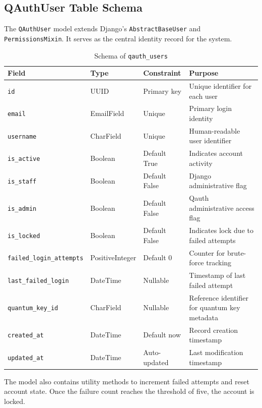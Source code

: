 \documentclass[12pt,a4paper]{report}
\begin{document}
\subsection{QAuthUser Table Schema}
The \texttt{QAuthUser} model extends Django's \texttt{AbstractBaseUser} and \texttt{PermissionsMixin}. It serves as the central identity record for the system.

\begin{table}[H]
\centering
\small
\renewcommand{\arraystretch}{1.3}
\caption{Schema of \texttt{qauth\_users}}
\label{tab:qauth-users}
\begin{tabular}{|p{4.0cm}|p{2.8cm}|p{1.8cm}|p{5.5cm}|}
\hline
\textbf{Field} & \textbf{Type} & \textbf{Constraint} & \textbf{Purpose} \\
\hline
\texttt{id} & UUID & Primary key & Unique identifier for each user \\
\hline
\texttt{email} & EmailField & Unique & Primary login identity \\
\hline
\texttt{username} & CharField & Unique & Human-readable user identifier \\
\hline
\texttt{is\_active} & Boolean & Default True & Indicates account activity \\
\hline
\texttt{is\_staff} & Boolean & Default False & Django administrative flag \\
\hline
\texttt{is\_admin} & Boolean & Default False & Qauth administrative access flag \\
\hline
\texttt{is\_locked} & Boolean & Default False & Indicates lock due to failed attempts \\
\hline
\texttt{failed\_login\_attempts} & PositiveInteger & Default 0 & Counter for brute-force tracking \\
\hline
\texttt{last\_failed\_login} & DateTime & Nullable & Timestamp of last failed attempt \\
\hline
\texttt{quantum\_key\_id} & CharField & Nullable & Reference identifier for quantum key metadata \\
\hline
\texttt{created\_at} & DateTime & Default now & Record creation timestamp \\
\hline
\texttt{updated\_at} & DateTime & Auto-updated & Last modification timestamp \\
\hline
\end{tabular}
\end{table}

The model also contains utility methods to increment failed attempts and reset account state. Once the failure count reaches the threshold of five, the account is locked.
\end{document}
